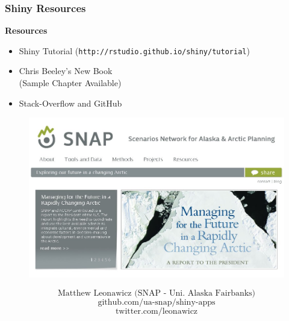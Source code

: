 \documentclass{beamer}
\begin{document}
\begin{frame}
\Large
\frametitle{Shiny Resources}
\vspace{-1.5cm}
\textbf{Resources}
\begin{itemize}

\item Shiny Tutorial (\texttt{http://rstudio.github.io/shiny/tutorial}) \bigskip
\item Chris Beeley's New Book\\ (Sample Chapter Available) \bigskip
\item Stack-Overflow and GitHub 
\end{itemize}

\end{frame}
\begin{frame}
\begin{figure}
\vspace{0.5cm}
\centering
\includegraphics[width=0.85\linewidth]{./snap2}

\end{figure}
\Large
\[ \mbox{Matthew Leonawicz (SNAP - Uni. Alaska Fairbanks)}  \]
\[\mbox{github.com/ua-snap/shiny-apps}‎\]
\[ \mbox{twitter.com/leonawicz} \]

\end{frame}
\end{document}
